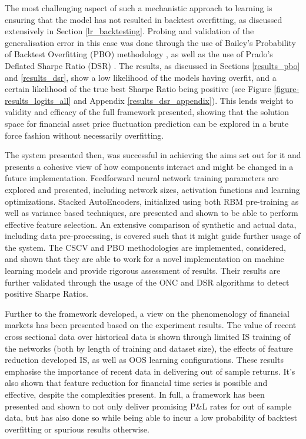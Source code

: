 \documentclass[a4paper,11pt,oneside]{article}
\theoremstyle{plain}
\theoremstyle{definition}
\begin{document}
	The most challenging aspect of such a mechanistic approach to learning is ensuring that the model has not resulted in backtest overfitting, as discussed extensively in Section \ref{lr_backtesting}. Probing and validation of the generalisation error in this case was done through the use of Bailey's Probability of Backtest Overfitting (PBO) methodology \citep{BailyPBO}, as well as the use of Prado's Deflated Sharpe Ratio (DSR) \citep{PradoDSR}. The results, as discussed in Sections \ref{results_pbo} and \ref{results_dsr}, show a low likelihood of the models having overfit, and a certain likelihood of the true best Sharpe Ratio being positive (see Figure \ref{figure-results_logits_all} and Appendix \ref{results_dsr_appendix}). This lends weight to validity and efficacy of the full framework presented, showing that the solution space for financial asset price fluctuation prediction can be explored in a brute force fashion without necessarily overfitting.\newline

	The system presented then, was successful in achieving the aims set out for it and presents a cohesive view of how components interact and might be changed in a future implementation. Feedforward neural network training parameters are explored and presented, including network sizes, activation functions and learning optimizations. Stacked AutoEncoders, initialized using both RBM pre-training as well as variance based techniques, are presented and shown to be able to perform effective feature selection. An extensive comparison of synthetic and actual data, including data pre-processing, is covered such that it might guide further usage of the system. The CSCV and PBO methodologies are implemented, considered, and shown that they are able to work for a novel implementation on machine learning models and provide rigorous assessment of results. Their results are further validated through the usage of the ONC and DSR algorithms to detect positive Sharpe Ratios. \newline 
	
	Further to the framework developed, a view on the phenomenology of financial markets has been presented based on the experiment results. The value of recent cross sectional data over historical data is shown through limited IS training of the networks (both by length of training and dataset size), the effects of feature reduction developed IS, as well as OOS learning configurations. These results emphasise the importance of recent data in delivering out of sample returns. It's also shown that feature reduction for financial time series is possible and effective, despite the complexities present. In full, a framework has been presented and shown to not only deliver promising P\&L rates for out of sample data, but has also done so while being able to incur a low probability of backtest overfitting or spurious results otherwise.
	
\end{document}
